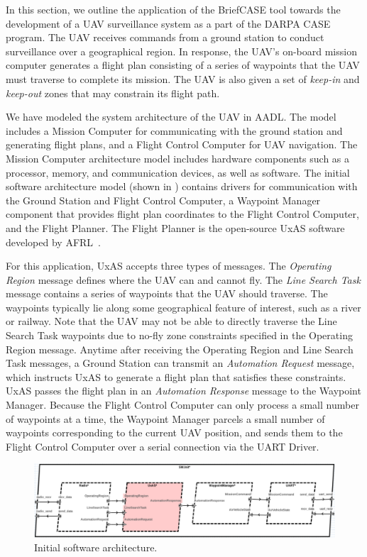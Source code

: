 In this section, we outline the application of the BriefCASE tool towards the development of a UAV surveillance system as a part of the DARPA CASE program.
The UAV receives commands from a ground station to conduct surveillance over a geographical region. In response, the UAV's on-board mission computer generates a flight plan consisting of a series of waypoints that the UAV must traverse to complete its mission. The UAV is also given a set of \textit{keep-in} and \textit{keep-out} zones that may constrain its flight path.

We have modeled the system architecture of the UAV in AADL.  The model includes a Mission Computer for communicating with the ground station and generating flight plans, and a Flight Control Computer for UAV navigation.  The Mission Computer architecture model includes hardware components such as a processor, memory, and communication devices, as well as software.
%
The initial software architecture model (shown in ) contains drivers for communication with the Ground Station and Flight Control Computer, a Waypoint Manager component that provides flight plan coordinates to the Flight Control Computer, and the Flight Planner.  The Flight Planner is the open-source UxAS software developed by AFRL~\cite{uxas}. 

For this application, UxAS accepts three types of messages.  The \textit{Operating Region} message defines where the UAV can and cannot fly.  The \textit{Line Search Task} message contains a series of waypoints that the UAV should traverse.  The waypoints typically lie along some geographical feature of interest, such as a river or railway.  Note that the UAV may not be able to directly traverse the Line Search Task waypoints due to no-fly zone constraints specified in the Operating Region message.  Anytime after receiving the Operating Region and Line Search Task messages, a Ground Station can transmit an \textit{Automation Request} message, which instructs UxAS to generate a flight plan that satisfies these constraints.  UxAS passes the flight plan in an \textit{Automation Response} message to the Waypoint Manager.  Because the Flight Control Computer can only process a small number of waypoints at a time, the Waypoint Manager parcels a small number of waypoints corresponding to the current UAV position, and sends them to the Flight Control Computer over a serial connection via the UART Driver.

\begin{figure}[h]
	\centering
	\includegraphics[width=1\columnwidth]{figs/sw-initial.png}
	\caption{Initial software architecture.} 
	\label{fig:sw-initial} 
\end{figure}

